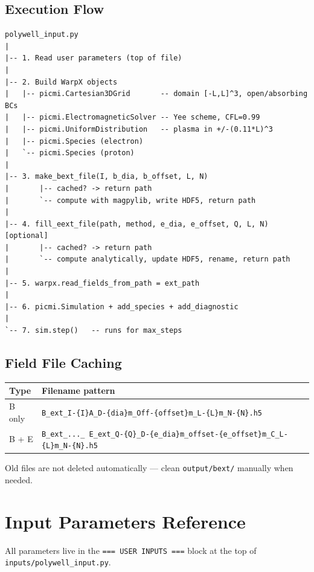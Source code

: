\documentclass[11pt, a4paper]{article}
\begin{document}
\subsection{Execution Flow}

\begin{lstlisting}[style=plain]
polywell_input.py
|
|-- 1. Read user parameters (top of file)
|
|-- 2. Build WarpX objects
|   |-- picmi.Cartesian3DGrid       -- domain [-L,L]^3, open/absorbing BCs
|   |-- picmi.ElectromagneticSolver -- Yee scheme, CFL=0.99
|   |-- picmi.UniformDistribution   -- plasma in +/-(0.11*L)^3
|   |-- picmi.Species (electron)
|   `-- picmi.Species (proton)
|
|-- 3. make_bext_file(I, b_dia, b_offset, L, N)
|       |-- cached? -> return path
|       `-- compute with magpylib, write HDF5, return path
|
|-- 4. fill_eext_file(path, method, e_dia, e_offset, Q, L, N)  [optional]
|       |-- cached? -> return path
|       `-- compute analytically, update HDF5, rename, return path
|
|-- 5. warpx.read_fields_from_path = ext_path
|
|-- 6. picmi.Simulation + add_species + add_diagnostic
|
`-- 7. sim.step()   -- runs for max_steps
\end{lstlisting}

\subsection{Field File Caching}

\begin{longtable}{L{2.5cm} L{11.5cm}}
\toprule
\textbf{Type} & \textbf{Filename pattern} \\
\midrule
B only &
\texttt{B\_ext\_I-\{I\}A\_D-\{dia\}m\_Off-\{offset\}m\_L-\{L\}m\_N-\{N\}.h5} \\[0.3em]
B + E &
\texttt{B\_ext\_...\_ E\_ext\_Q-\{Q\}\_D-\{e\_dia\}m\_offset-\{e\_offset\}m\_C\_L-\{L\}m\_N-\{N\}.h5} \\
\bottomrule
\end{longtable}

Old files are not deleted automatically --- clean \texttt{output/bext/} manually when needed.

\section{Input Parameters Reference}

All parameters live in the \texttt{=== USER INPUTS ===} block at the top of
\texttt{inputs/polywell\_input.py}.
\end{document}

